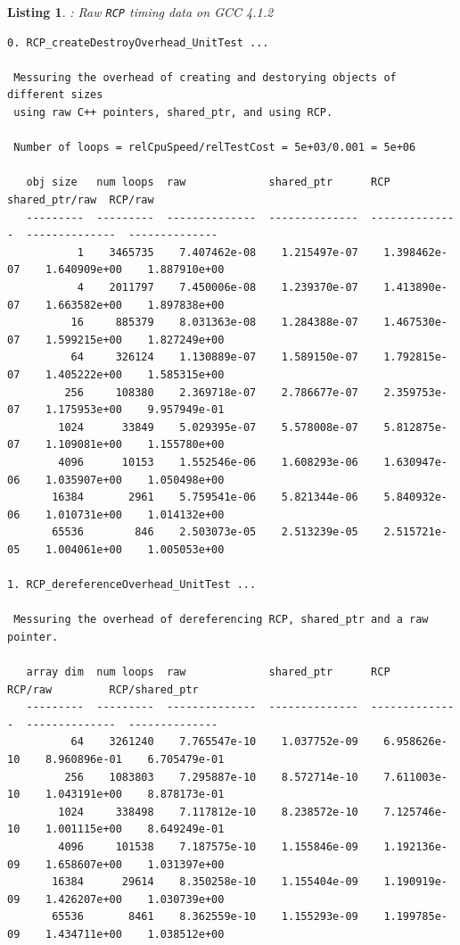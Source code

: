 \documentclass[pdf,ps2pdf,11pt]{SANDreport}
\newtheorem{listing}{Listing}
\begin{document}
\begin{listing}: Raw {}\texttt{RCP} timing data on GCC 4.1.2  \\
\label{listing:RCP-GCC-Timings}
{\scriptsize\begin{verbatim}
0. RCP_createDestroyOverhead_UnitTest ... 
 
 Messuring the overhead of creating and destorying objects of different sizes
 using raw C++ pointers, shared_ptr, and using RCP.
 
 Number of loops = relCpuSpeed/relTestCost = 5e+03/0.001 = 5e+06
 
   obj size   num loops  raw             shared_ptr      RCP             shared_ptr/raw  RCP/raw       
   ---------  ---------  --------------  --------------  --------------  --------------  --------------
           1    3465735    7.407462e-08    1.215497e-07    1.398462e-07    1.640909e+00    1.887910e+00
           4    2011797    7.450006e-08    1.239370e-07    1.413890e-07    1.663582e+00    1.897838e+00
          16     885379    8.031363e-08    1.284388e-07    1.467530e-07    1.599215e+00    1.827249e+00
          64     326124    1.130889e-07    1.589150e-07    1.792815e-07    1.405222e+00    1.585315e+00
         256     108380    2.369718e-07    2.786677e-07    2.359753e-07    1.175953e+00    9.957949e-01
        1024      33849    5.029395e-07    5.578008e-07    5.812875e-07    1.109081e+00    1.155780e+00
        4096      10153    1.552546e-06    1.608293e-06    1.630947e-06    1.035907e+00    1.050498e+00
       16384       2961    5.759541e-06    5.821344e-06    5.840932e-06    1.010731e+00    1.014132e+00
       65536        846    2.503073e-05    2.513239e-05    2.515721e-05    1.004061e+00    1.005053e+00

1. RCP_dereferenceOverhead_UnitTest ... 
 
 Messuring the overhead of dereferencing RCP, shared_ptr and a raw pointer.
 
   array dim  num loops  raw             shared_ptr      RCP             RCP/raw         RCP/shared_ptr
   ---------  ---------  --------------  --------------  --------------  --------------  --------------
          64    3261240    7.765547e-10    1.037752e-09    6.958626e-10    8.960896e-01    6.705479e-01
         256    1083803    7.295887e-10    8.572714e-10    7.611003e-10    1.043191e+00    8.878173e-01
        1024     338498    7.117812e-10    8.238572e-10    7.125746e-10    1.001115e+00    8.649249e-01
        4096     101538    7.187575e-10    1.155846e-09    1.192136e-09    1.658607e+00    1.031397e+00
       16384      29614    8.350258e-10    1.155404e-09    1.190919e-09    1.426207e+00    1.030739e+00
       65536       8461    8.362559e-10    1.155293e-09    1.199785e-09    1.434711e+00    1.038512e+00


\end{verbatim}}
\end{listing}
\end{document}
